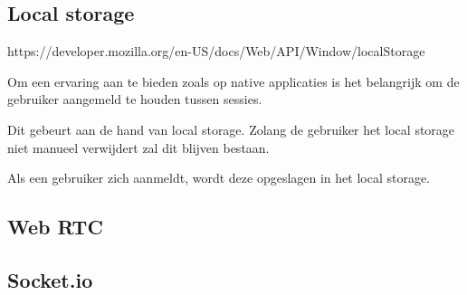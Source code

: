 	\subsection{Local storage}
	
		https://developer.mozilla.org/en-US/docs/Web/API/Window/localStorage
		
		Om een ervaring aan te bieden zoals op native applicaties is het belangrijk om de gebruiker aangemeld te houden tussen sessies.
		
		Dit gebeurt aan de hand van local storage. Zolang de gebruiker het local storage niet manueel verwijdert zal dit blijven bestaan. 
		
		Als een gebruiker zich aanmeldt, wordt deze opgeslagen in het local storage.
		


	\subsection{Web RTC}
	
	\subsection{Socket.io}